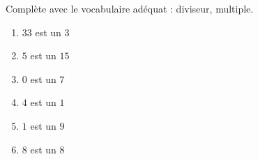 %
%
	Complète avec le vocabulaire adéquat : diviseur, multiple.
	\begin{enumerate}[cols=2, itemsep=.5cm]
		\item \(33\) est un  \dotfill \(3\)
		\item \(5\) est un  \dotfill \(15\)
		\item \(0\) est un  \dotfill \(7\)
		\item \(4\) est un  \dotfill \(1\)
		\item \(1\) est un  \dotfill \(9\)
		\item \(8\) est un  \dotfill \(8\)
	\end{enumerate}
